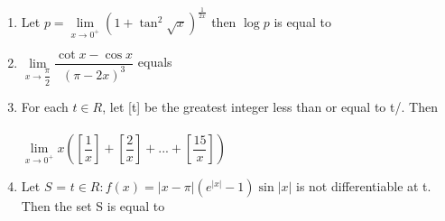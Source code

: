 \begin{enumerate}[label=\arabic*.,ref=\thesubsection.\theenumi]
\item Let $p=\lim\limits_{x \to 0^+}\left(1+\tan^2\sqrt{x}\right)^{\frac{1}{2x}}$ then $\log p$ is equal to
\begin{itemize}
\end{itemize}

\item $\lim\limits_{x \to \dfrac{\pi}{2}}\dfrac{\cot x-\cos x}{(\pi-2x)^3}$ equals
\begin{itemize}
\end{itemize}

\item For each $t \in R$, let [t] be the greatest integer less than or equal to t/. Then\\
\\$\lim\limits_{x \to 0^+}x\left(\left[\dfrac{1}{x}\right]+\left[\dfrac{2}{x}\right]+...+\left[\dfrac{15}{x}\right]\right)$
\begin{itemize}
\end{itemize}

\item Let $S$ = $t \in R:f(x)=|x-\pi|(e^{|x|}-1)\sin |x|$ is not differentiable at t. Then the set S is equal to
\begin{itemize}
\end{itemize}


\end{enumerate}
